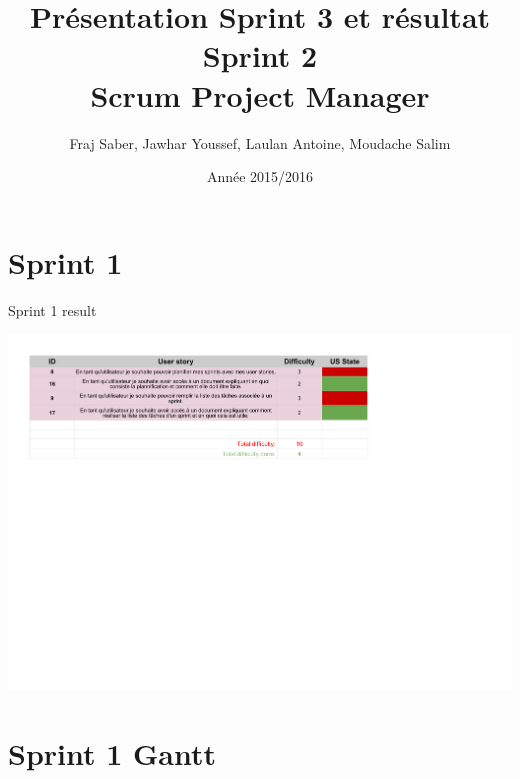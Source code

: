 \documentclass{beamer}
\title{}
\title{Présentation Sprint 3 et résultat Sprint 2 \\ Scrum Project Manager}
\author{Fraj Saber, Jawhar Youssef, Laulan Antoine, Moudache Salim}
\institute{Université de Bordeaux}
\date{Année 2015/2016}
\begin{document}


\begin{frame}
    \titlepage
\end{frame}



\section{Sprint 1}

\begin{frame}{Sprint 1 result}
	\begin{center}
        \includegraphics[scale=0.55]{Sprint2.pdf}
        \end{center}
\end{frame}


\section{Sprint 1 Gantt }
\end{document}
